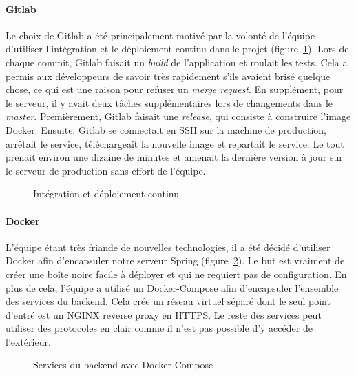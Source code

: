         \paragraph{Gitlab}
        Le choix de Gitlab a été principalement motivé par la volonté de l'équipe d'utiliser l'intégration et le déploiement continu dans le projet (figure~\ref{fig.gitlab}). Lors de chaque commit, Gitlab faisait un \emph{build} de l'application et roulait les tests. Cela a permis aux développeurs de savoir très rapidement s'ils avaient brisé quelque chose, ce qui est une raison pour refuser un \emph{merge request}. En supplément, pour le serveur, il y avait deux tâches supplémentaires lors de changements dans le \emph{master}. Premièrement, Gitlab faisait une \emph{release}, qui consiste à construire l'image Docker. Ensuite, Gitlab se connectait en SSH sur la machine de production, arrêtait le service, téléchargeait la nouvelle image et repartait le service. Le tout prenait environ une dizaine de minutes et amenait la dernière version à jour sur le serveur de production sans effort de l'équipe.
        
        \begin{figure}[hp] \centering
            
            \caption{Intégration et déploiement continu}
            \label{fig.gitlab}
        \end{figure}  
        
        \paragraph{Docker}
        L'équipe étant très friande de nouvelles technologies, il a été décidé d'utiliser Docker afin d'encapsuler notre serveur Spring (figure~\ref{fig.docker}). Le but est vraiment de créer une boîte noire facile à déployer et qui ne requiert pas de configuration. En plus de cela, l'équipe a utilisé un Docker-Compose afin d'encapsuler l'ensemble des services du backend. Cela crée un réseau virtuel séparé dont le seul point d'entré est un NGINX reverse proxy en HTTPS. Le reste des services peut utiliser des protocoles en clair comme il n'est pas possible d'y accéder de l'extérieur.

        \begin{figure}[hp] \centering
            
            \caption{Services du backend avec Docker-Compose}
            \label{fig.docker}
        \end{figure}

